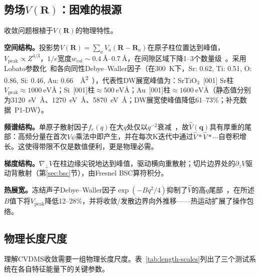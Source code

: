 \documentclass[twoside,11pt]{ctexart}
\begin{document}
\subsection{势场$V(\mathbf{R})$：困难的根源}

收敛问题根植于$V(\mathbf{R})$的物理特性。

\textbf{空间结构。}投影势$V(\mathbf{R})=\sum_a V_a(\mathbf{R}-\mathbf{R}_a)$在原子柱位置达到峰值，$V_\text{peak}\propto Z^{4/3}$，$1/e$宽度$w_\text{col}\sim\SIrange{0.4}{0.7}{\angstrom}$，在间隙区域下降1--3个数量级~\cite{LobatoVanDyck2014}。采用Lobato参数化~\cite{LobatoVanDyck2014}和各向同性Debye--Waller因子（在\SI{300}{\kelvin}下，Sr: 0.62, Ti: 0.51, O: 0.86, Si: 0.46, Au: 0.66~\SI{}{\angstrom\squared}~\cite{Forbes2010}），代表性DW展宽峰值为：SrTiO$_3$~[001] Sr柱$V_\text{peak}\approx\SI{1000}{\electronvolt\angstrom}$；Si~[001]柱$\approx\SI{500}{\electronvolt\angstrom}$；Au~[001]柱$\approx\SI{1600}{\electronvolt\angstrom}$（静态值分别为\SI{3120}{\electronvolt\angstrom}、\SI{1270}{\electronvolt\angstrom}、\SI{5870}{\electronvolt\angstrom}；DW展宽使峰值降低61--73\%；补充数据~P1-DW）。

\textbf{频谱结构。}单原子散射因子$f_e(q)$在大$q$处仅以$q^{-2}$衰减~\cite{LobatoVanDyck2014}，故$\hat V(\mathbf{q})$具有厚重的尾部：高频分量在首次$V\psi$乘法中即产生，并在每次K迭代中通过$\hat V*\hat V*\cdots$自卷积增长。这使得带限不仅是数值便利，更是物理必需。

\textbf{梯度结构。}$\nabla_\perp V$在柱边缘尖锐地达到峰值，驱动横向重散射；切片边界处的$\partial_z V$驱动背散射（第\ref{sec:bsc}节），由Fresnel BSC算符积分。

\textbf{热展宽。}冻结声子Debye--Waller因子$\exp(-Bq^2/4)$抑制了$\hat V$的高$q$尾部~\cite{Forbes2010}，在所述$B$值下将$V_\text{peak}$降低12--28\%，并将收敛/发散边界向外推移——热运动扩展了操作包络。

\subsection{物理长度尺度}\label{sec:length-scales}

理解CVDMS收敛需要一组物理长度尺度。表~\ref{tab:length-scales}列出了三个测试系统在各自特征能量下的关键参数。
\end{document}
